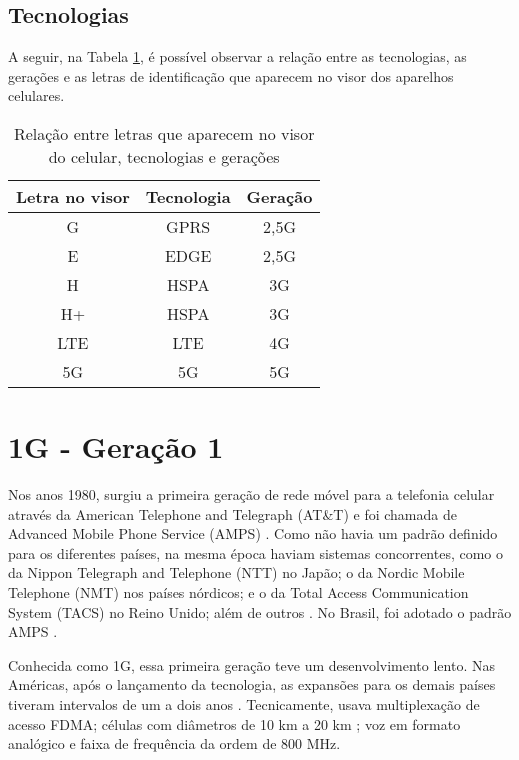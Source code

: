 \documentclass[11pt,oneside,a4paper]{abntex2}
\begin{document}
\subsection*{Tecnologias}

A seguir, na Tabela \ref{sopa-letrinhas-2}, é possível observar a relação entre as tecnologias, as gerações e as letras de identificação que aparecem no visor dos aparelhos celulares.

\begin{table}
\caption{Relação entre letras que aparecem no visor do celular, tecnologias e gerações}
\label{sopa-letrinhas-2}
\begin{center}
\begin{tabular}{||c||c||c||}
	\hline
	\textbf{Letra no visor} & \textbf{Tecnologia} & \textbf{Geração} \\
	\hline
	\hline
	G & GPRS & 2,5G \\
	\hline
	E & EDGE & 2,5G \\
	\hline
	H & HSPA & 3G \\
	\hline
	H+ & HSPA & 3G \\
	\hline
	LTE & LTE & 4G \\
	\hline
	5G & 5G & 5G \\
	\hline
\end{tabular}
\end{center}
\end{table}

\section*{1G - Geração 1}
\label{1g}

Nos anos 1980, surgiu a primeira geração de rede móvel para a telefonia celular através da American Telephone and Telegraph (AT\&T) e foi chamada de Advanced Mobile Phone Service (AMPS) \cite{tcc1}. Como não havia um padrão definido para os diferentes países, na mesma época haviam sistemas concorrentes, como o da Nippon Telegraph and Telephone (NTT) no Japão; o da Nordic Mobile Telephone (NMT) nos países nórdicos; e o da Total Access Communication System (TACS) no Reino Unido; além de outros \cite{wiki-1g-br, wiki-1g-en}. No Brasil, foi adotado o padrão AMPS \cite{tcc2}.

Conhecida como 1G, essa primeira geração teve um desenvolvimento lento. Nas Américas, após o lançamento da tecnologia, as expansões para os demais países tiveram intervalos de um a dois anos \cite{repor1}. Tecnicamente, usava multiplexação de acesso FDMA; células com diâmetros de 10 km a 20 km \cite{aula3}; voz em formato analógico e faixa de frequência da ordem de 800 MHz.
\end{document}
